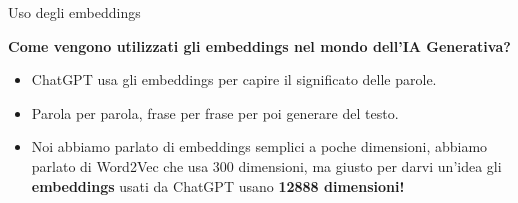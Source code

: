\documentclass[aspectratio=169]{beamer}
\begin{document}
%
%
\begin{frame}{Uso degli embeddings}

\textbf{Come vengono utilizzati gli embeddings nel mondo dell'IA Generativa?}\\
\vspace{0.5cm}
\begin{itemize}
\item ChatGPT usa gli embeddings per capire il significato delle parole. 
\item Parola per parola, frase per frase per poi generare del testo. \item Noi abbiamo parlato di embeddings semplici a poche dimensioni, abbiamo parlato di Word2Vec che usa 300 dimensioni, ma giusto per darvi un'idea gli \textbf{embeddings} usati da ChatGPT usano \textbf{12888 dimensioni!}
\end{itemize}
\end{frame}
%
%
\end{document}
